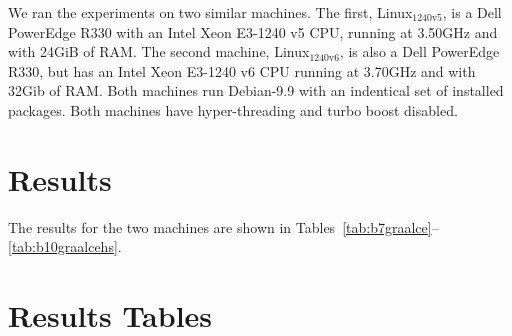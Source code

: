 \documentclass[a4paper]{article}
\newcommand{\graalce}{\textsc{Graal CE}\xspace}
\newcommand{\graalcehs}{\textsc{Graal CE Hotspot}\xspace}
\newcommand{\bencherseven}{Linux$_\mathrm{1240v5}$\xspace}
\newcommand{\bencherten}{Linux$_\mathrm{1240v6}$\xspace}
\begin{document}

We ran the experiments on two similar machines. The first, \bencherseven, is a
Dell PowerEdge R330 with an Intel Xeon E3-1240 v5 CPU, running at 3.50GHz and
with 24GiB of RAM. The second machine, \bencherten, is also a Dell PowerEdge
R330, but has an Intel Xeon E3-1240 v6 CPU running at 3.70GHz
and with 32Gib of RAM. Both machines run Debian-9.9 with an indentical set of
installed packages. Both machines have hyper-threading and turbo boost
disabled.

\section{Results}
\label{sec:results}

The results for the two machines are shown in Tables~\ref{tab:b7graalce}--\ref{tab:b10graalcehs}.




\appendix

\section{Results Tables}

\newcommand{\captionbsevengraalce}{Results for \graalce on \bencherseven.}


\newpage
\newcommand{\captionbsevengraalcehs}{Results for \graalcehs on \bencherseven.}


\newpage
\newcommand{\captionbtengraalce}{Results for \graalce on \bencherten.}


\newpage
\newcommand{\captionbtengraalcehs}{Results for \graalcehs on \bencherten.}

\end{document}
